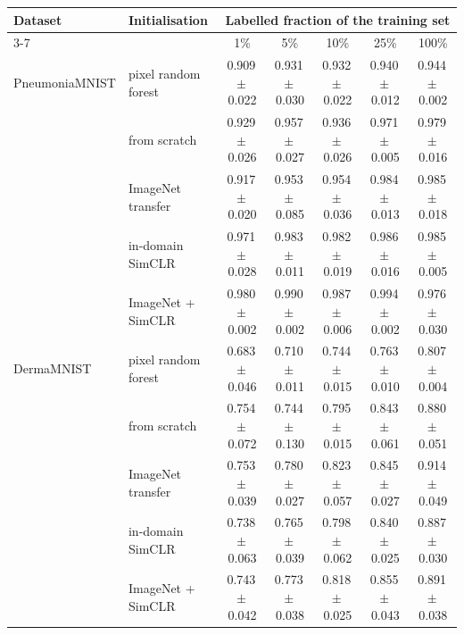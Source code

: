 \begin{tabular}{llccccc}
\toprule
Dataset & Initialisation & \multicolumn{5}{c}{Labelled fraction of the training set} \\
\cmidrule(lr){3-7}
 & & 1\% & 5\% & 10\% & 25\% & 100\% \\
\midrule
PneumoniaMNIST & pixel random forest & 0.909\,{\tiny $\pm$\,0.022} & 0.931\,{\tiny $\pm$\,0.030} & 0.932\,{\tiny $\pm$\,0.022} & 0.940\,{\tiny $\pm$\,0.012} & 0.944\,{\tiny $\pm$\,0.002} \\
 & from scratch & 0.929\,{\tiny $\pm$\,0.026} & 0.957\,{\tiny $\pm$\,0.027} & 0.936\,{\tiny $\pm$\,0.026} & 0.971\,{\tiny $\pm$\,0.005} & 0.979\,{\tiny $\pm$\,0.016} \\
 & ImageNet transfer & 0.917\,{\tiny $\pm$\,0.020} & 0.953\,{\tiny $\pm$\,0.085} & 0.954\,{\tiny $\pm$\,0.036} & 0.984\,{\tiny $\pm$\,0.013} & 0.985\,{\tiny $\pm$\,0.018} \\
 & in-domain SimCLR & 0.971\,{\tiny $\pm$\,0.028} & 0.983\,{\tiny $\pm$\,0.011} & 0.982\,{\tiny $\pm$\,0.019} & 0.986\,{\tiny $\pm$\,0.016} & 0.985\,{\tiny $\pm$\,0.005} \\
 & ImageNet + SimCLR & 0.980\,{\tiny $\pm$\,0.002} & 0.990\,{\tiny $\pm$\,0.002} & 0.987\,{\tiny $\pm$\,0.006} & 0.994\,{\tiny $\pm$\,0.002} & 0.976\,{\tiny $\pm$\,0.030} \\
\midrule
DermaMNIST & pixel random forest & 0.683\,{\tiny $\pm$\,0.046} & 0.710\,{\tiny $\pm$\,0.011} & 0.744\,{\tiny $\pm$\,0.015} & 0.763\,{\tiny $\pm$\,0.010} & 0.807\,{\tiny $\pm$\,0.004} \\
 & from scratch & 0.754\,{\tiny $\pm$\,0.072} & 0.744\,{\tiny $\pm$\,0.130} & 0.795\,{\tiny $\pm$\,0.015} & 0.843\,{\tiny $\pm$\,0.061} & 0.880\,{\tiny $\pm$\,0.051} \\
 & ImageNet transfer & 0.753\,{\tiny $\pm$\,0.039} & 0.780\,{\tiny $\pm$\,0.027} & 0.823\,{\tiny $\pm$\,0.057} & 0.845\,{\tiny $\pm$\,0.027} & 0.914\,{\tiny $\pm$\,0.049} \\
 & in-domain SimCLR & 0.738\,{\tiny $\pm$\,0.063} & 0.765\,{\tiny $\pm$\,0.039} & 0.798\,{\tiny $\pm$\,0.062} & 0.840\,{\tiny $\pm$\,0.025} & 0.887\,{\tiny $\pm$\,0.030} \\
 & ImageNet + SimCLR & 0.743\,{\tiny $\pm$\,0.042} & 0.773\,{\tiny $\pm$\,0.038} & 0.818\,{\tiny $\pm$\,0.025} & 0.855\,{\tiny $\pm$\,0.043} & 0.891\,{\tiny $\pm$\,0.038} \\
\bottomrule
\end{tabular}